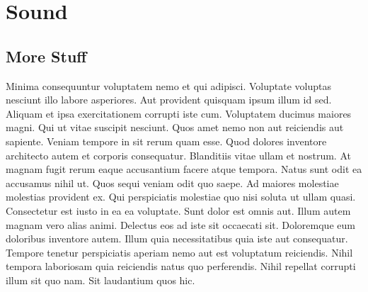 
\makeatletter\@openrightfalse
\part{Sound}



\chapter{More Stuff}

Minima consequuntur voluptatem nemo et qui adipisci. Voluptate voluptas
nesciunt illo labore asperiores. Aut provident quisquam ipsum illum id sed.
Aliquam et ipsa exercitationem corrupti iste cum. Voluptatem ducimus maiores
magni. Qui ut vitae suscipit nesciunt. Quos amet nemo non aut reiciendis aut
sapiente. Veniam tempore in sit rerum quam esse. Quod dolores inventore
architecto autem et corporis consequatur. Blanditiis vitae ullam et nostrum. At
magnam fugit rerum eaque accusantium facere atque tempora. Natus sunt odit ea
accusamus nihil ut. Quos sequi veniam odit quo saepe. Ad maiores molestiae
molestias provident ex. Qui perspiciatis molestiae quo nisi soluta ut ullam
quasi. Consectetur est iusto in ea ea voluptate. Sunt dolor est omnis aut.
Illum autem magnam vero alias animi. Delectus eos ad iste sit occaecati sit.
Doloremque eum doloribus inventore autem. Illum quia necessitatibus quia iste
aut consequatur. Tempore tenetur perspiciatis aperiam nemo aut est voluptatum
reiciendis. Nihil tempora laboriosam quia reiciendis natus quo perferendis.
Nihil repellat corrupti illum sit quo nam. Sit laudantium quos hic.

\@openrighttrue\makeatother
